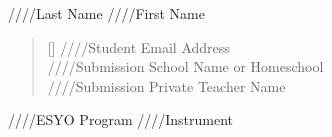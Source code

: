 \begin{flashcard}{%
////Last Name
////First Name \\
\begin{verse}[\versewidth]
////Student Email Address \\
////Submission School Name or Homeschool \\
////Submission Private Teacher Name \\
\end{verse}}
////ESYO Program
////Instrument \\
\end{flashcard}
